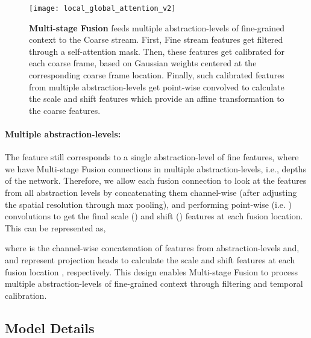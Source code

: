 \documentclass[final]{cvpr}
\begin{document}
\begin{figure}[t]
	\centering
	\vspace{-1em}
	\texttt{[image: local\_global\_attention\_v2]}
\caption{\textbf{Multi-stage Fusion} feeds multiple abstraction-levels of fine-grained context to the Coarse stream. First, Fine stream features get filtered through a self-attention mask. Then, these features get calibrated for each coarse frame, based on Gaussian weights centered at the corresponding coarse frame location. Finally, such calibrated features from multiple abstraction-levels get point-wise convolved to calculate the scale and shift features which provide an affine transformation to the coarse features.}
	\label{fig:fusing}
\end{figure}

\paragraph{Multiple abstraction-levels:} The feature  still corresponds to a single abstraction-level  of fine features, where we have Multi-stage Fusion connections in multiple abstraction-levels, i.e., depths of the network. Therefore, we allow each fusion connection to look at the features from all abstraction levels by concatenating them channel-wise (after adjusting the spatial resolution through max pooling), and performing point-wise (i.e. ) convolutions to get the final scale () and shift () features at each fusion location. This can be represented as,

where  is the channel-wise concatenation of features from  abstraction-levels and,  and  represent projection heads to calculate the scale and shift features at each fusion location , respectively. This design enables Multi-stage Fusion to process multiple abstraction-levels of fine-grained context through filtering and temporal calibration.

\subsection{Model Details}
\label{subsec:implementation}
\end{document}
